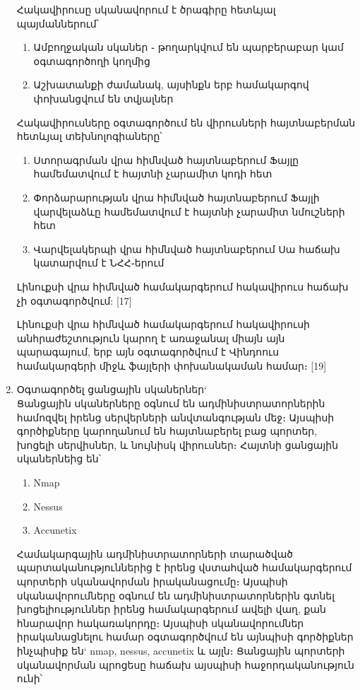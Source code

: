 \documentclass[a4paper,12pt]{article}
\begin{document}
\begin{sloppypar}
\begin{enumerate}
	Հակավիրուսը սկանավորում է ծրագիրը հետևյալ պայմաններում՝
	\begin{enumerate}
		\item Ամբողջական սկաներ ֊ թողարկվում են պարբերաբար կամ օգտագործողի կողմից
		\item Աշխատանքի ժամանակ, այսինքն երբ համակարգով փոխանցվում են տվյալներ
	\end{enumerate}

	Հակավիրուսները օգտագործում են վիրուսների հայտնաբերման հետևյալ տեխնոլոգիաները՝

	\begin{enumerate}
	\item Ստորագրման վրա հիմնված հայտնաբերում
		Ֆայլը համեմատվում է հայտնի չարամիտ կոդի հետ
	\item Փորձարարության վրա հիմնված հայտնաբերում
		Ֆայլի վարվելաձևը համեմատվում է հայտնի չարամիտ
		նմուշների հետ
	\item Վարվելակերպի վրա հիմնված հայտնաբերում
		Սա հաճախ կատարվում է ՆՀՀ֊երում
	\end{enumerate}

	Լինուքսի վրա հիմնված համակարգերում հակավիրուս հաճախ չի օգտագործվում: [17]

	Լինուքսի վրա հիմնված համակարգերում հակավիրուսի անհրաժեշտություն կարող է
	առաջանալ միայն այն պարագայում, երբ այն օգտագործվում է Վինդոուս համակարգերի
	միջև ֆայլերի փոխանակաման համար։ [19]
\item Օգտագործել ցանցային սկաներներ`\\
    Ցանցային սկաներները օգնում են ադմինիստրատորներին համոզվել իրենց
    սերվերների անվտանգության մեջ։ Այսպիսի գործիքները կարողանում են
    հայտնաբերել բաց պորտեր, խոցելի սերվիսներ, և նույնիսկ վիրուսներ։
    Հայտնի ցանցային սկաներնեից են՝
    \begin{enumerate}
        \item Nmap
        \item Nessus
        \item Accunetix
    \end{enumerate}
	Համակարգային ադմինիստրատորների տարածված պարտականություններից է իրենց
	վստահված համակարգերում պորտերի սկանավորման իրականացումը։
	Այսպիսի սկանավորումները օգնում են ադմինիստրատորներին գտնել խոցելիություններ
	իրենց համակարգերում ավելի վաղ, քան հնարավոր հակառակորդը։
	Այսպիսի սկանավորումներ իրականացնելու համար օգտագործվում են այնպիսի
	գործիքներ ինչպիսիք են` nmap, nessus, accunetix և այլն։
	Ցանցային պորտերի սկանավորման պրոցեսը հաճախ այսպիսի հաջորդականություն ունի՝


\end{enumerate}
\end{sloppypar}
\end{document}
